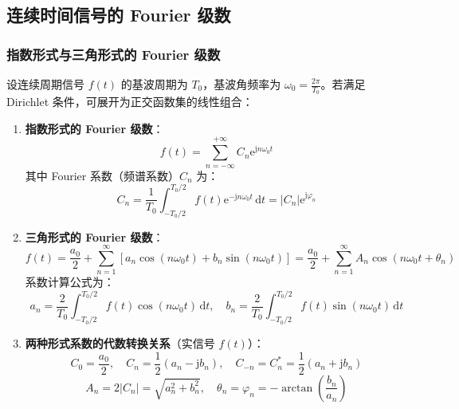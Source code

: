 \documentclass[11pt,a4paper,fontset=fandol]{ctexart}
\theoremstyle{remark}
\begin{document}
\subsection{连续时间信号的 Fourier 级数}

\subsubsection{指数形式与三角形式的 Fourier 级数}
设连续周期信号 $f(t)$ 的基波周期为 $T_0$，基波角频率为 $\omega_0 = \frac{2\pi}{T_0}$。若满足 Dirichlet 条件，可展开为正交函数集的线性组合：
\begin{enumerate}
    \item \textbf{指数形式的 Fourier 级数}：
    \begin{equation}
        f(t) = \sum_{n=-\infty}^{+\infty} C_n \mathrm{e}^{\mathrm{j}n\omega_0 t}
    \end{equation}
    其中 Fourier 系数（频谱系数）$C_n$ 为：
    \begin{equation}
        C_n = \frac{1}{T_0} \int_{-T_0/2}^{T_0/2} f(t)\mathrm{e}^{-\mathrm{j}n\omega_0 t}\,\mathrm{d}t = |C_n|\mathrm{e}^{\mathrm{j}\varphi_n}
    \end{equation}
    \item \textbf{三角形式的 Fourier 级数}：
    \begin{equation}
        f(t) = \frac{a_0}{2} + \sum_{n=1}^\infty \left[ a_n \cos(n\omega_0 t) + b_n \sin(n\omega_0 t) \right] = \frac{a_0}{2} + \sum_{n=1}^\infty A_n \cos(n\omega_0 t + \theta_n)
    \end{equation}
    系数计算公式为：
    \begin{equation}
        a_n = \frac{2}{T_0} \int_{-T_0/2}^{T_0/2} f(t)\cos(n\omega_0 t)\,\mathrm{d}t, \quad b_n = \frac{2}{T_0} \int_{-T_0/2}^{T_0/2} f(t)\sin(n\omega_0 t)\,\mathrm{d}t
    \end{equation}
    \item \textbf{两种形式系数的代数转换关系}（实信号 $f(t)$）：
    \begin{equation}
        C_0 = \frac{a_0}{2}, \quad C_n = \frac{1}{2}(a_n - \mathrm{j}b_n), \quad C_{-n} = C_n^* = \frac{1}{2}(a_n + \mathrm{j}b_n)
    \end{equation}
    \begin{equation}
        A_n = 2|C_n| = \sqrt{a_n^2 + b_n^2}, \quad \theta_n = \varphi_n = -\arctan\left(\frac{b_n}{a_n}\right)
    \end{equation}
\end{enumerate}
\end{document}
